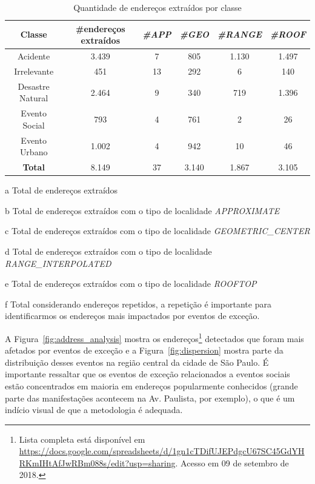 \documentclass[
	12pt,				%
	oneside,			%
	a4paper,			%
	english,			%
	brazil				%
	]{abntex2ppgsi}
\begin{document}
{{{\begin{table}[!htb]
\centering
\caption {Quantidade de endereços extraídos por classe}
\label {tab:qtdExtractedAddresses}
\begin{threeparttable}
\begin{tabular}{c|c|c|c|c|c}
\toprule
\textbf{Classe} & \textbf{\#endereços extraídos\tnote{a}} & \textbf{\textit{\#APP\tnote{b}}} & \textbf{\textit{\#GEO\tnote{c}}} & \textbf{\textit{\#RANGE\tnote{d}}} & \textbf{\textit{\#ROOF\tnote{e}}} \\
\midrule
Acidente & 3.439 & 7 & 805 & 1.130 & 1.497 \\
\hline
Irrelevante & 451 & 13 & 292 & 6 & 140 \\
\hline
Desastre Natural & 2.464 & 9 & 340 & 719 & 1.396 \\
\hline
Evento Social & 793 & 4 & 761 & 2 & 26 \\
\hline
Evento Urbano & 1.002 & 4 & 942 & 10 & 46 \\
\midrule
\midrule
\textbf{Total} & 8.149 & 37 & 3.140 & 1.867 & 3.105 \\
\bottomrule
\end{tabular}
\begin{tablenotes}
\item[a] Total de endereços extraídos
\item[b] Total de endereços extraídos com o tipo de localidade \textit{APPROXIMATE}
\item[c] Total de endereços extraídos com o tipo de localidade \textit{GEOMETRIC\_CENTER}
\item[d] Total de endereços extraídos com o tipo de localidade \textit{RANGE\_INTERPOLATED}
\item[e] Total de endereços extraídos com o tipo de localidade \textit{ROOFTOP}
\item[f] Total considerando endereços repetidos, a repetição é importante para identificarmos os endereços mais impactados por eventos de exceção.
\end{tablenotes}
\end{threeparttable}
\end{table}


A Figura~\ref{fig:address_analysis} mostra os endereços\footnote{Lista completa está disponível em \url{https://docs.google.com/spreadsheets/d/1gn1cTDifUJEPdgcU67SC45GdYHRKmIHtAfJwRBm088s/edit?usp=sharing}. Acesso em 09 de setembro de 2018.} detectados que foram mais afetados por eventos de exceção e a Figura~\ref{fig:dispersion} mostra parte da distribuição desses eventos na região central da cidade de São Paulo. É importante ressaltar que os eventos de exceção relacionados a eventos sociais estão concentrados em maioria em endereços popularmente conhecidos (grande parte das manifestações acontecem na Av. Paulista, por exemplo), o que é um indício visual de que a metodologia é adequada.

}}}
\end{document}
